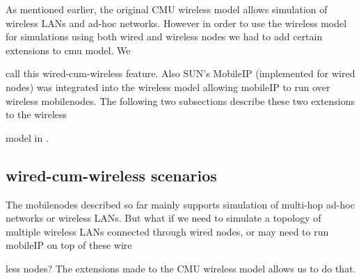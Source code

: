 {As mentioned earlier, the original CMU wireless model allows simulation of wireless LANs and ad-hoc networks. However in order to use the wireless model for simulations using both wired and wireless nodes we had to add certain extensions to cmu model. We 






















call this wired-cum-wireless feature. Also SUN's MobileIP (implemented for wired nodes) was integrated into the wireless model allowing mobileIP to run over wireless mobilenodes. The following two subsections describe these two extensions to the wireless 






















model in \ns. 


\subsection{wired-cum-wireless scenarios}
\label{sec:wired-cum-wireless}

The mobilenodes described so far mainly supports simulation of multi-hop ad-hoc networks or wireless LANs. But what if we need to simulate a topology of multiple wireless LANs connected through wired nodes, or may need to run mobileIP on top of these wire






















less nodes? The extensions made to the CMU wireless model allows us to do that.

}
